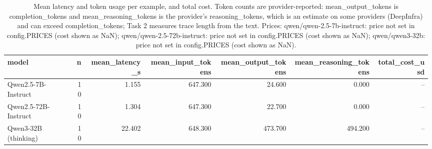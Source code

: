 \begin{table}[htbp]
\caption{Mean latency and token usage per example, and total cost. Token counts are provider-reported: mean\_output\_tokens is completion\_tokens and mean\_reasoning\_tokens is the provider's reasoning\_tokens, which is an estimate on some providers (DeepInfra) and can exceed completion\_tokens; Task 2 measures trace length from the text. Prices: qwen/qwen-2.5-7b-instruct: price not set in config.PRICES (cost shown as NaN); qwen/qwen-2.5-72b-instruct: price not set in config.PRICES (cost shown as NaN); qwen/qwen3-32b: price not set in config.PRICES (cost shown as NaN).}
\label{tab:task1_efficiency}
\begin{tabular}{lrrrrrr}
\toprule
model & n & mean\_latency\_s & mean\_input\_tokens & mean\_output\_tokens & mean\_reasoning\_tokens & total\_cost\_usd \\
\midrule
Qwen2.5-7B-Instruct & 10 & 1.155 & 647.300 & 24.600 & 0.000 & -- \\
Qwen2.5-72B-Instruct & 10 & 1.304 & 647.300 & 22.700 & 0.000 & -- \\
Qwen3-32B (thinking) & 10 & 22.402 & 648.300 & 473.700 & 494.200 & -- \\
\bottomrule
\end{tabular}
\end{table}
